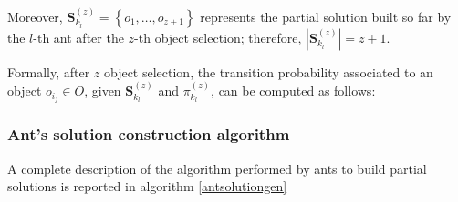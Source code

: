 \documentclass[12pt,a4paper]{report}
\begin{document}
Moreover, $\textbf{S}_{k_l}^{(z)} = \left\{o_1,\ldots,o_{z+1}\right\}$ represents the partial solution built so far by the $l$-th ant after the $z$-th object selection; therefore, $|\textbf{S}_{k_l}^{(z)}| = z + 1$.  

Formally, after $z$ object selection, the transition probability associated to an object $o_{i_j} \in O$, given $\textbf{S}_{k_l}^{(z)}$ and $\pi_{k_l}^{(z)}$, can be computed as follows:

\subsubsection{Ant's solution construction algorithm}

A complete description of the algorithm performed by ants to build partial solutions is reported in algorithm \ref{antsolutiongen}
\end{document}
